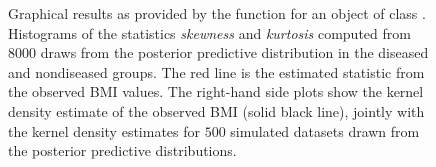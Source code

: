 \begin{figure}[ht!]
\begin{center}
\end{center}
\caption{Graphical results as provided by the  function for an object of class . Histograms of the statistics \textit{skewness} and \textit{kurtosis} computed from $8000$ draws from the posterior predictive distribution in the diseased and nondiseased groups. The red line is the estimated statistic from the observed BMI values. The right-hand side plots show the kernel density estimate of the observed BMI (solid black line), jointly with the kernel density estimates for $500$ simulated datasets drawn from the posterior predictive distributions.}
\label{cROC_bnp_pred_checks}
\end{figure}

